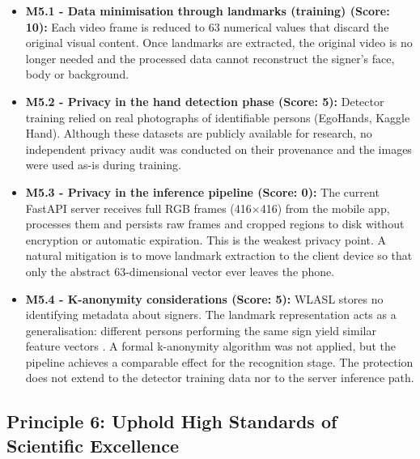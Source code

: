 \begin{itemize}
    \item \textbf{M5.1 - Data minimisation through landmarks (training) (Score: 10):} Each video frame is reduced to 63 numerical values that discard the original visual content. Once landmarks are extracted, the original video is no longer needed and the processed data cannot reconstruct the signer's face, body or background.
    \item \textbf{M5.2 - Privacy in the hand detection phase (Score: 5):} Detector training relied on real photographs of identifiable persons (EgoHands, Kaggle Hand). Although these datasets are publicly available for research, no independent privacy audit was conducted on their provenance and the images were used as-is during training.
    \item \textbf{M5.3 - Privacy in the inference pipeline (Score: 0):} The current FastAPI server receives full RGB frames (416$\times$416) from the mobile app, processes them and persists raw frames and cropped regions to disk without encryption or automatic expiration. This is the weakest privacy point. A natural mitigation is to move landmark extraction to the client device so that only the abstract 63-dimensional vector ever leaves the phone.
    \item \textbf{M5.4 - K-anonymity considerations (Score: 5):} WLASL stores no identifying metadata about signers. The landmark representation acts as a generalisation: different persons performing the same sign yield similar feature vectors \cite{sweeney2002kanonymity}. A formal k-anonymity algorithm was not applied, but the pipeline achieves a comparable effect for the recognition stage. The protection does not extend to the detector training data nor to the server inference path.
\end{itemize}

\subsection{Principle 6: Uphold High Standards of Scientific Excellence}


